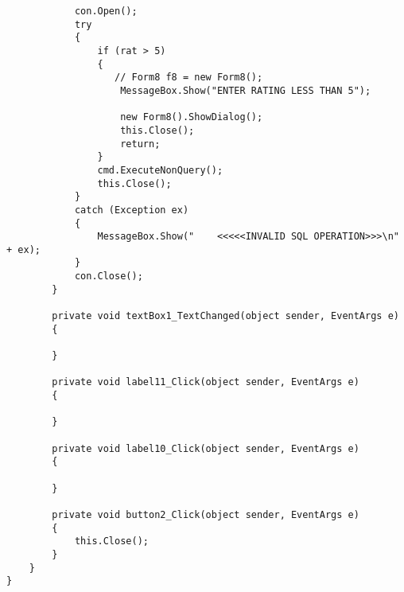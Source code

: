 \begin{lstlisting}
            con.Open();
            try
            {
                if (rat > 5)
                {
                   // Form8 f8 = new Form8();
                    MessageBox.Show("ENTER RATING LESS THAN 5");
                    
                    new Form8().ShowDialog();
                    this.Close();
                    return;
                }
                cmd.ExecuteNonQuery();
                this.Close();
            }
            catch (Exception ex)
            {
                MessageBox.Show("    <<<<<INVALID SQL OPERATION>>>\n" + ex);
            }
            con.Close();
        }

        private void textBox1_TextChanged(object sender, EventArgs e)
        {

        }

        private void label11_Click(object sender, EventArgs e)
        {

        }

        private void label10_Click(object sender, EventArgs e)
        {

        }

        private void button2_Click(object sender, EventArgs e)
        {
            this.Close();
        }
    }
}
\end{lstlisting}
